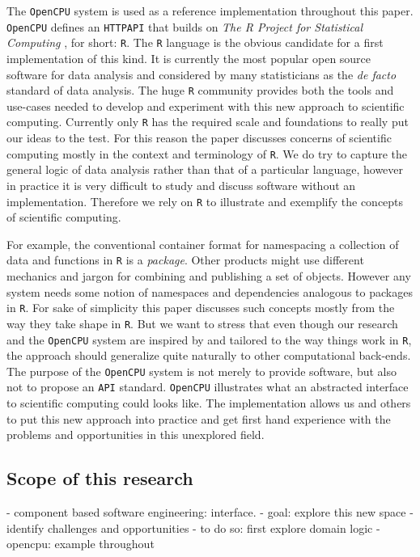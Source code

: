 \documentclass{article}
\newcommand{\R}{\texttt{R}\xspace}
\newcommand{\HTTP}{\texttt{HTTP}\xspace}
\newcommand{\API}{\texttt{API}\xspace}
\newcommand{\OpenCPU}{\texttt{OpenCPU}\xspace}
\begin{document}
The \OpenCPU system is used as a reference implementation throughout this paper. \OpenCPU defines an \HTTP \API that builds on \emph{The R Project for Statistical Computing} \citep{R}, for short: \R. The \R language is the obvious candidate for a first implementation of this kind. It is currently the most popular open source software for data analysis and considered by many statisticians as the \emph{de facto} standard of data analysis. The huge \R community provides both the tools and use-cases needed to develop and experiment with this new approach to scientific computing. Currently only \R has the required scale and foundations to really put our ideas to the test. For this reason the paper discusses concerns of scientific computing mostly in the context and terminology of \R. We do try to capture the general logic of data analysis rather than that of a particular language, however in practice it is very difficult to study and discuss software without an implementation. Therefore we rely on \R to illustrate and exemplify the concepts of scientific computing. 

For example, the conventional container format for namespacing a collection of data and functions in \R is a \emph{package}. Other products might use different mechanics and jargon for combining and publishing a set of objects. However any system needs some notion of namespaces and dependencies analogous to packages in \R. For sake of simplicity this paper discusses such concepts mostly from the way they take shape in \R. But we want to stress that even though our research and the \OpenCPU system are inspired by and tailored to the way things work in \R, the approach should generalize quite naturally to other computational back-ends. The purpose of the \OpenCPU system is not merely to provide software, but also not to propose an \API standard. \OpenCPU illustrates what an abstracted interface to scientific computing could looks like. The implementation allows us and others to put this new approach into practice and get first hand experience with the problems and opportunities in this unexplored field. 


\subsection{Scope of this research}

- component based software engineering: interface.
- goal: explore this new space
- identify challenges and opportunities
- to do so: first explore domain logic
- opencpu: example throughout
\end{document}
